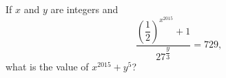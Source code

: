 If $x$ and $y$ are integers and
\[
\dfrac{\left(\dfrac{1}{2}\right)^{x^{2015}}+1}{27^{\dfrac{y}{3}}}=729,
\]
what is the value of $x^{2015}+y^5$?
